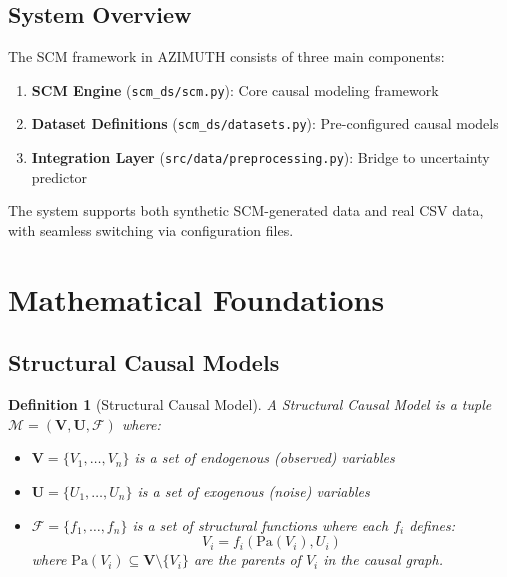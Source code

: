 \documentclass[11pt,a4paper]{article}
\newtheorem{definition}{Definition}[section]
\begin{document}
\subsection{System Overview}

The SCM framework in AZIMUTH consists of three main components:

\begin{enumerate}
    \item \textbf{SCM Engine} (\texttt{scm\_ds/scm.py}): Core causal modeling framework
    \item \textbf{Dataset Definitions} (\texttt{scm\_ds/datasets.py}): Pre-configured causal models
    \item \textbf{Integration Layer} (\texttt{src/data/preprocessing.py}): Bridge to uncertainty predictor
\end{enumerate}

The system supports both synthetic SCM-generated data and real CSV data, with seamless switching via configuration files.

\section{Mathematical Foundations}

\subsection{Structural Causal Models}

\begin{definition}[Structural Causal Model]
A Structural Causal Model is a tuple $\mathcal{M} = (\mathbf{V}, \mathbf{U}, \mathcal{F})$ where:
\begin{itemize}
    \item $\mathbf{V} = \{V_1, \ldots, V_n\}$ is a set of endogenous (observed) variables
    \item $\mathbf{U} = \{U_1, \ldots, U_n\}$ is a set of exogenous (noise) variables
    \item $\mathcal{F} = \{f_1, \ldots, f_n\}$ is a set of structural functions where each $f_i$ defines:
    \[
    V_i = f_i(\text{Pa}(V_i), U_i)
    \]
    where $\text{Pa}(V_i) \subseteq \mathbf{V} \setminus \{V_i\}$ are the parents of $V_i$ in the causal graph.
\end{itemize}
\end{definition}
\end{document}
